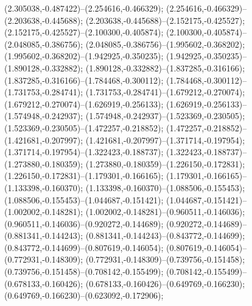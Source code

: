  (2.305038,-0.487422)--(2.254616,-0.466329);
 (2.254616,-0.466329)--(2.203638,-0.445688);
 (2.203638,-0.445688)--(2.152175,-0.425527);
 (2.152175,-0.425527)--(2.100300,-0.405874);
 (2.100300,-0.405874)--(2.048085,-0.386756);
 (2.048085,-0.386756)--(1.995602,-0.368202);
 (1.995602,-0.368202)--(1.942925,-0.350235);
 (1.942925,-0.350235)--(1.890128,-0.332882);
 (1.890128,-0.332882)--(1.837285,-0.316166);
 (1.837285,-0.316166)--(1.784468,-0.300112);
 (1.784468,-0.300112)--(1.731753,-0.284741);
 (1.731753,-0.284741)--(1.679212,-0.270074);
 (1.679212,-0.270074)--(1.626919,-0.256133);
 (1.626919,-0.256133)--(1.574948,-0.242937);
 (1.574948,-0.242937)--(1.523369,-0.230505);
 (1.523369,-0.230505)--(1.472257,-0.218852);
 (1.472257,-0.218852)--(1.421681,-0.207997);
 (1.421681,-0.207997)--(1.371714,-0.197954);
 (1.371714,-0.197954)--(1.322423,-0.188737);
 (1.322423,-0.188737)--(1.273880,-0.180359);
 (1.273880,-0.180359)--(1.226150,-0.172831);
 (1.226150,-0.172831)--(1.179301,-0.166165);
 (1.179301,-0.166165)--(1.133398,-0.160370);
 (1.133398,-0.160370)--(1.088506,-0.155453);
 (1.088506,-0.155453)--(1.044687,-0.151421);
 (1.044687,-0.151421)--(1.002002,-0.148281);
 (1.002002,-0.148281)--(0.960511,-0.146036);
 (0.960511,-0.146036)--(0.920272,-0.144689);
 (0.920272,-0.144689)--(0.881341,-0.144243);
 (0.881341,-0.144243)--(0.843772,-0.144699);
 (0.843772,-0.144699)--(0.807619,-0.146054);
 (0.807619,-0.146054)--(0.772931,-0.148309);
 (0.772931,-0.148309)--(0.739756,-0.151458);
 (0.739756,-0.151458)--(0.708142,-0.155499);
 (0.708142,-0.155499)--(0.678133,-0.160426);
 (0.678133,-0.160426)--(0.649769,-0.166230);
 (0.649769,-0.166230)--(0.623092,-0.172906);
